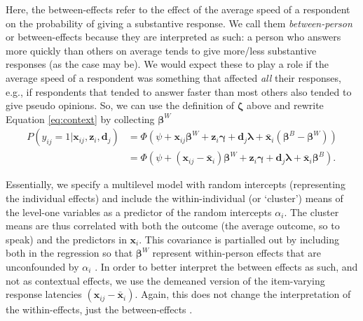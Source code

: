 \documentclass[Royal,times,sageh]{sagej}
\begin{document}
Here, the between-effects refer to the effect of the average speed of a
respondent on the probability of giving a substantive response. We call
them \emph{between-person} or between-effects because they are
interpreted as such: a person who answers more quickly than others on
average tends to give more/less substantive responses (as the case may
be). We would expect these to play a role if the average speed of a
respondent was something that affected \emph{all} their responses, e.g.,
if respondents that tended to answer faster than most others also tended
to give pseudo opinions. So, we can use the definition of \(\bm{\zeta}\)
above and rewrite Equation \eqref{eq:context} by collecting
\(\bm{\beta}^{W}\) \begin{align}
P(y_{ij} = 1 | \bm{x}_{ij}, \bm{z}_{i}, \bm{d}_{j}) & = \Phi(\psi + \bm{x}_{ij}\bm{\beta}^{W} + \bm{z}_{i}\bm{\gamma} + \bm{d}_{j}\bm{\lambda} + \bar{\bm{x}}_{i}(\bm{\beta}^{B} - \bm{\beta}^{W})) \\
 & = \Phi(\psi + (\bm{x}_{ij} - \bar{\bm{x}}_{i})\bm{\beta}^{W} + \bm{z}_{i}\bm{\gamma} + \bm{d}_{j}\bm{\lambda} + \bar{\bm{x}}_{i}\bm{\beta}^{B}).
\end{align}

Essentially, we specify a multilevel model with random intercepts
(representing the individual effects) and include the within-individual
(or `cluster') means of the level-one variables as a predictor of the
random intercepts \(\alpha_{i}\). The cluster means are thus correlated
with both the outcome (the average outcome, so to speak) and the
predictors in \(\bm{x}_{i}\). This covariance is partialled out by
including both in the regression so that \(\bm{\beta}^{W}\) represent
within-person effects that are unconfounded by \(\alpha_{i}\)
\citep{Ruettenauer2019b, Hamaker2019, Wooldridge2002, Mundlak1978, Schunck2017}.
In order to better interpret the between effects as such, and not as
contextual effects, we use the demeaned version of the item-varying
response latencies \((\bm{x}_{ij} - \bar{\bm{x}}_{i})\). Again, this
does not change the interpretation of the within-effects, just the
between-effects \citep{Schunck2017, Bell2015}.
\end{document}
